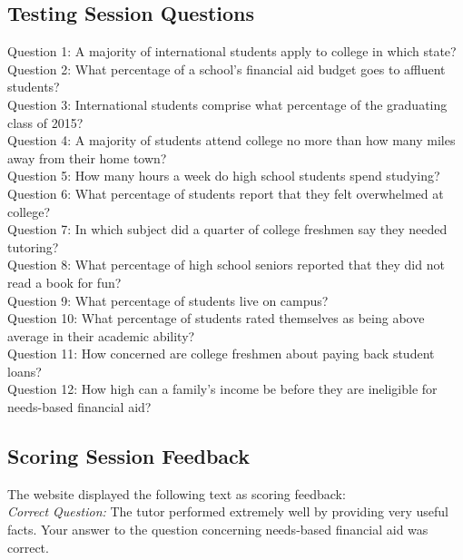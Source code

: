 \documentclass{sig-alternate-05-2015}
\begin{document}
{\subsection{Testing Session Questions}
\noindent Question 1: A majority of international students apply to college in which state?\\[\baselineskip]
\noindent Question 2: What percentage of a school's financial aid budget goes to affluent students?\\[\baselineskip]
\noindent Question 3: International students comprise what percentage of the graduating class of 2015?\\[\baselineskip]
\noindent Question 4: A majority of students attend college no more than how many miles away from their home town?\\[\baselineskip]
\noindent Question 5: How many hours a week do high school students spend studying?\\[\baselineskip]
\noindent Question 6: What percentage of students report that they felt overwhelmed at college?\\[\baselineskip]
\noindent Question 7: In which subject did a quarter of college freshmen say they needed tutoring?\\[\baselineskip]
\noindent Question 8: What percentage of high school seniors reported that they did not read a book for fun?\\[\baselineskip]
\noindent Question 9: What percentage of students live on campus?\\[\baselineskip]
\noindent Question 10: What percentage of students rated themselves as being above average in their academic ability?\\[\baselineskip]
\noindent Question 11: How concerned are college freshmen about paying back student loans?\\[\baselineskip]
\noindent Question 12: How high can a family's income be before they are ineligible for needs-based financial aid?\\

\subsection{Scoring Session Feedback}
\noindent The website displayed the following text as scoring feedback:\\

\noindent \emph{Correct Question:} The tutor performed extremely well by providing very useful facts. Your answer to the question concerning needs-based financial aid was correct.\\


}
\end{document}
